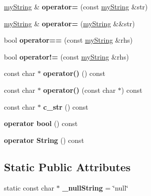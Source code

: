 \begin{DoxyCompactItemize}
\hyperlink{class_e_s_p_m_a_n_1_1my_string}{my\+String} \& {\bfseries operator=} (const \hyperlink{class_e_s_p_m_a_n_1_1my_string}{my\+String} \&str)
\item 
\mbox{\label{class_e_s_p_m_a_n_1_1my_string_a7e420109dcb5a6eab4ff204d93108431}} 
\hyperlink{class_e_s_p_m_a_n_1_1my_string}{my\+String} \& {\bfseries operator=} (\hyperlink{class_e_s_p_m_a_n_1_1my_string}{my\+String} \&\&str)
\item 
\mbox{\label{class_e_s_p_m_a_n_1_1my_string_a10b9e8d3a8265bc3dba062dd79fd824e}} 
bool {\bfseries operator==} (const \hyperlink{class_e_s_p_m_a_n_1_1my_string}{my\+String} \&rhs)
\item 
\mbox{\label{class_e_s_p_m_a_n_1_1my_string_ac578ab49440b8e207d6aff1b13814f5f}} 
bool {\bfseries operator!=} (const \hyperlink{class_e_s_p_m_a_n_1_1my_string}{my\+String} \&rhs)
\item 
\mbox{\label{class_e_s_p_m_a_n_1_1my_string_a8f21c84e1613a248203b2179fa9ab75f}} 
const char $\ast$ {\bfseries operator()} () const
\item 
\mbox{\label{class_e_s_p_m_a_n_1_1my_string_aaf8e0b8509fd6d1201d3d27f2ec23ab3}} 
const char $\ast$ {\bfseries operator()} (const char $\ast$) const
\item 
\mbox{\label{class_e_s_p_m_a_n_1_1my_string_a1c423d16e99ff41c9a230258710c6510}} 
const char $\ast$ {\bfseries c\+\_\+str} () const
\item 
\mbox{\label{class_e_s_p_m_a_n_1_1my_string_a80ea963f812af38a1150dca96f9c2b23}} 
{\bfseries operator bool} () const
\item 
\mbox{\label{class_e_s_p_m_a_n_1_1my_string_a7ef5f739cb0157ac3f9d5128ef722d63}} 
{\bfseries operator String} () const
\end{DoxyCompactItemize}
\subsection*{Static Public Attributes}
\begin{DoxyCompactItemize}
\item 
\mbox{\label{class_e_s_p_m_a_n_1_1my_string_adfdf69c1c7138db02cb425c546c61716}} 
static const char $\ast$ {\bfseries \+\_\+null\+String} = \char`\"{}null\char`\"{}
\end{DoxyCompactItemize}
